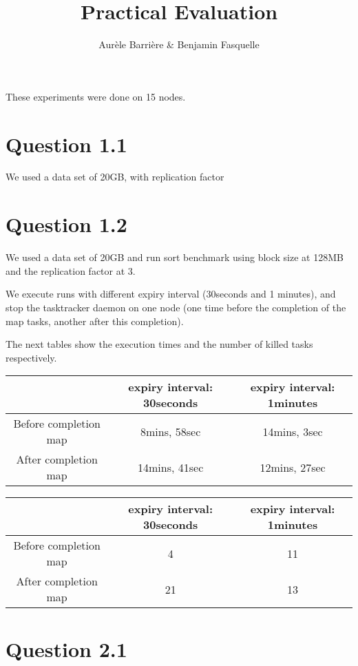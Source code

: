 \documentclass{article}
\author{Aur\`ele Barri\`ere \& Benjamin Fasquelle}
\title{Practical Evaluation}
\begin{document}
\maketitle

These experiments were done on 15 nodes.

\section*{Question 1.1}

We used a data set of 20GB, with replication factor

\section*{Question 1.2}

We used a data set of 20GB and run sort benchmark using block size at 128MB and the replication factor at 3.

We execute runs with different expiry interval (30seconds and 1 minutes), and stop the tasktracker daemon on one node (one time before the completion of the map tasks, another after this completion).

The next tables show the execution times and the number of killed tasks respectively.

\begin{center}
\begin{tabular}{|c|c|c|}
\hline
\ & expiry interval: 30seconds & expiry interval: 1minutes \\
\hline
Before completion map & 8mins, 58sec & 14mins, 3sec \\
\hline
After completion map & 14mins, 41sec & 12mins, 27sec\\
\hline
\end{tabular}
\end{center}

\begin{center}
\begin{tabular}{|c|c|c|}
\hline
\ & expiry interval: 30seconds & expiry interval: 1minutes \\
\hline
Before completion map & 4 & 11 \\
\hline
After completion map & 21 & 13 \\
\hline
\end{tabular}
\end{center}


\section*{Question 2.1}
\end{document}
